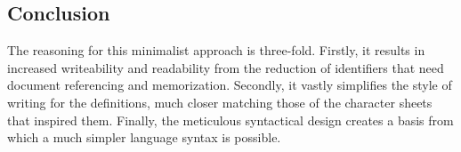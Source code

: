 \subsection{Conclusion}

The reasoning for this minimalist approach is three-fold. Firstly, it results in increased writeability and readability from the reduction of identifiers that need document referencing and memorization. Secondly, it vastly simplifies the style of writing for the definitions, much closer matching those of the character sheets that inspired them. Finally, the meticulous syntactical design creates a basis from which a much simpler language syntax is possible.%